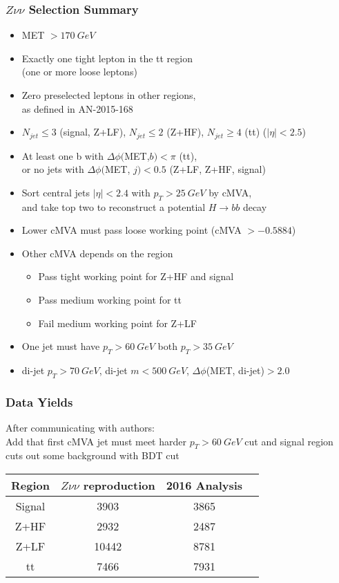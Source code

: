 \documentclass{beamer}
\begin{document}
\begin{frame}
  \frametitle{$Z\nu\nu$ Selection Summary}
  \begin{itemize}
  \item MET $> \SI{170}{GeV}$
  \item Exactly one tight lepton in the tt region \\ (one or more loose leptons)
  \item Zero preselected leptons in other regions, \\
    as defined in AN-2015-168
  \item $N_{jet} \le 3$ (signal, Z+LF), $N_{jet} \le 2$ (Z+HF), $N_{jet} \ge 4$ (tt) ($|\eta| < 2.5$)
  \item At least one b with $\Delta \phi($MET,$b) < \pi$ (tt), \\
    or no jets with $\Delta \phi($MET, $j) < 0.5$ (Z+LF, Z+HF, signal)
  \item Sort central jets $|\eta| < 2.4$ with $p_T > \SI{25}{GeV}$ by cMVA, \\
    and take top two to reconstruct a potential $H \rightarrow bb$ decay
  \item Lower cMVA must pass loose working point (cMVA $> -0.5884$)
  \item Other cMVA depends on the region
    \begin{itemize}
    \item Pass tight working point for Z+HF and signal
    \item Pass medium working point for tt
    \item Fail medium working point for Z+LF
    \end{itemize}
  \item One jet must have $p_T > \SI{60}{GeV}$ both $p_T > \SI{35}{GeV}$
  \item di-jet $p_T > \SI{70}{GeV}$, di-jet $m < \SI{500}{GeV}$, $\Delta \phi$(MET, di-jet)$ > 2.0$
  \end{itemize}
\end{frame}

\begin{frame}
  \frametitle{Data Yields}
  After communicating with authors: \\
  Add that first cMVA jet must meet harder $p_T > \SI{60}{GeV}$ cut
  and signal region cuts out some background with BDT cut

  \hspace{24pt}

  \centering
  \begin{tabular}{c c c c}
    Region & $Z\nu\nu$ reproduction & 2016 Analysis \\
    \hline
    Signal & 3903              & 3865          \\
    Z+HF   & 2932              & 2487          \\
    Z+LF   & 10442             & 8781          \\
    tt     & 7466              & 7931
  \end{tabular}

\end{frame}
\end{document}
